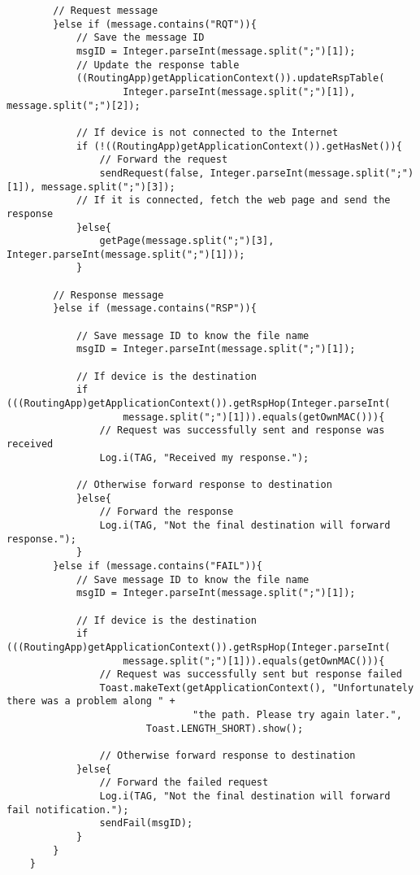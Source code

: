\begin{verbatim}
        // Request message
        }else if (message.contains("RQT")){
            // Save the message ID
            msgID = Integer.parseInt(message.split(";")[1]);
            // Update the response table
            ((RoutingApp)getApplicationContext()).updateRspTable(
                    Integer.parseInt(message.split(";")[1]), message.split(";")[2]);

            // If device is not connected to the Internet
            if (!((RoutingApp)getApplicationContext()).getHasNet()){
                // Forward the request
                sendRequest(false, Integer.parseInt(message.split(";")[1]), message.split(";")[3]);
            // If it is connected, fetch the web page and send the response
            }else{
                getPage(message.split(";")[3], Integer.parseInt(message.split(";")[1]));
            }

        // Response message
        }else if (message.contains("RSP")){

            // Save message ID to know the file name
            msgID = Integer.parseInt(message.split(";")[1]);

            // If device is the destination
            if (((RoutingApp)getApplicationContext()).getRspHop(Integer.parseInt(
                    message.split(";")[1])).equals(getOwnMAC())){
                // Request was successfully sent and response was received
                Log.i(TAG, "Received my response.");

            // Otherwise forward response to destination
            }else{
                // Forward the response
                Log.i(TAG, "Not the final destination will forward response.");
            }
        }else if (message.contains("FAIL")){
            // Save message ID to know the file name
            msgID = Integer.parseInt(message.split(";")[1]);

            // If device is the destination
            if (((RoutingApp)getApplicationContext()).getRspHop(Integer.parseInt(
                    message.split(";")[1])).equals(getOwnMAC())){
                // Request was successfully sent but response failed
                Toast.makeText(getApplicationContext(), "Unfortunately there was a problem along " +
                                "the path. Please try again later.",
                        Toast.LENGTH_SHORT).show();

                // Otherwise forward response to destination
            }else{
                // Forward the failed request
                Log.i(TAG, "Not the final destination will forward fail notification.");
                sendFail(msgID);
            }
        }
    }


\end{verbatim}
